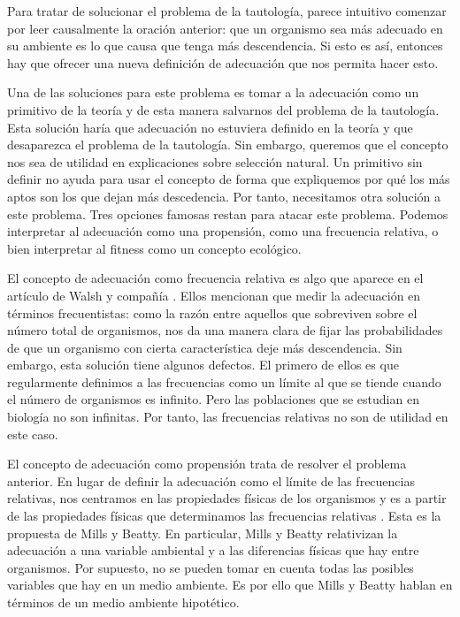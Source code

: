 Para tratar de solucionar el problema de la tautología, parece intuitivo comenzar por leer causalmente la oración anterior: que un organismo sea más adecuado en su ambiente es lo que causa que tenga más descendencia. Si esto es así, entonces hay que ofrecer una nueva definición de adecuación que nos permita hacer esto.

Una de las soluciones para este problema es tomar a la adecuación como un primitivo de la teoría y de esta manera salvarnos del problema de la tautología. Esta solución haría que adecuación no estuviera definido en la teoría y que desaparezca el problema de la tautología. Sin embargo, queremos que el concepto nos sea de utilidad en explicaciones sobre selección natural. Un primitivo sin definir no ayuda para usar el concepto de forma que expliquemos por qué los más aptos son los que dejan más descedencia. Por tanto, necesitamos otra solución a este problema. Tres opciones famosas restan para atacar este problema. Podemos interpretar al adecuación como una propensión, como una frecuencia relativa, o bien interpretar al fitness como un concepto ecológico.


El concepto de adecuación como frecuencia relativa es algo que aparece en el artículo de Walsh y compañía \citeyear{Walsh2002}. Ellos mencionan que medir la adecuación en términos frecuentistas: como la razón entre aquellos que sobreviven sobre el número total de organismos, nos da una manera clara de fijar las probabilidades de que un organismo con cierta característica deje más descendencia. Sin embargo, esta solución tiene algunos defectos. El primero de ellos es que regularmente definimos a las frecuencias como un límite al que se tiende cuando el número de organismos es infinito. Pero las poblaciones que se estudian en biología no son infinitas. Por tanto, las frecuencias relativas no son de utilidad en este caso.

El concepto de adecuación como propensión trata de resolver el problema anterior. En lugar de definir la adecuación como el límite de las frecuencias relativas, nos centramos en las propiedades físicas de los organismos y es a partir de las propiedades físicas que determinamos las frecuencias relativas \cite{Mills1979}. Esta es la propuesta de Mills y Beatty. En particular, Mills y Beatty relativizan la adecuación a una variable ambiental y a las diferencias físicas que hay entre organismos. Por supuesto, no se pueden tomar en cuenta todas las posibles variables que hay en un medio ambiente. Es por ello que Mills y Beatty hablan en términos de un medio ambiente hipotético.

